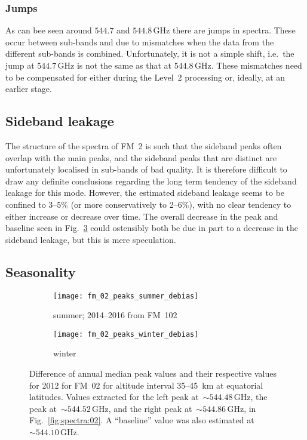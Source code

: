 \subsubsection{Jumps}
\label{FM02:jumps}
As can bee seen around $544.7$ and $544.8\,\mathrm{GHz}$ there are jumps in
spectra.  These occur between sub-bands and due to mismatches when the data
from the different sub-bands is combined.  Unfortunately, it is not a simple
shift, i.e.\ the jump at $544.7\,\mathrm{GHz}$ is not the same as that at
$544.8\,\mathrm{GHz}$.  These mismatches need to be compensated for either
during the Level~2 processing or, ideally, at an earlier stage.


\subsection{Sideband leakage}
\label{FM02:sbl}
The structure of the spectra of FM~2 is such that the sideband peaks often
overlap with the main peaks, and the sideband peaks that are distinct are
unfortunately localised in sub-bands of bad quality.  It is therefore difficult
to draw any definite conclusions regarding the long term tendency of the
sideband leakage for this mode.  However, the estimated sideband leakage seems
to be confined to 3--5\% (or more conservatively to 2--6\%), with no clear
tendency to either increase or decrease over time.  The overall decrease in the
 peak and baseline seen in Fig.~\ref{fig:peaks:02} could
ostensibly both be due in part to a decrease in the sideband leakage, but this
is mere speculation.


\subsection{Seasonality}
\label{FM02:seasonality}

\begin{figure}[ht]
    \centering
    \begin{subfigure}[b]{0.9545\textwidth}
        \texttt{[image: fm\_02\_peaks\_summer\_debias]}
        \caption{summer; 2014--2016 from FM~102}\label{fig:peaks:02:summer}
    \end{subfigure}
    \begin{subfigure}[b]{0.9545\textwidth}
        \texttt{[image: fm\_02\_peaks\_winter\_debias]}
        \caption{winter}\label{fig:peaks:02:winter}
    \end{subfigure}
    \caption{Difference of annual median peak values and their respective
        values for 2012 for FM~02 for altitude interval 35--45~km at
        equatorial latitudes. Values extracted for the left  peak
        at~$\sim544.48\,\mathrm{GHz}$, the  peak
        at~$\sim544.52\,\mathrm{GHz}$, and the right  peak
        at~$\sim544.86\,\mathrm{GHz}$, in Fig.~\ref{fig:spectra:02}.  A
        ``baseline'' value was also estimated
        at~$\sim544.10\,\mathrm{GHz}$.
        }\label{fig:peaks:02}
\end{figure}

